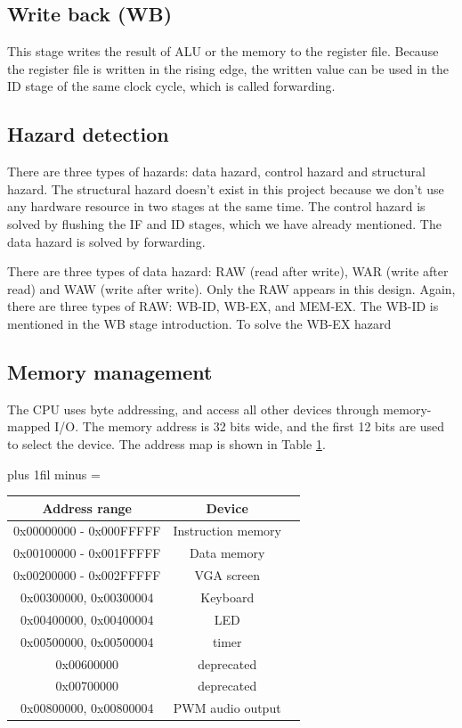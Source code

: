 \documentclass[
	a4paper, %
	11pt, %
]{CSUniSchoolLabReport}
\def\Scentering{\leftskip=0pt plus 1fil minus \Rmargin
                \rightskip=\leftskip}
\begin{document}
\subsection*{Write back (WB)}
This stage writes the result of ALU or the memory to the register file. Because the register file is written in the rising edge, the written value can be used in the ID stage of the same clock cycle, which is called forwarding.

\subsection*{Hazard detection}
There are three types of hazards: data hazard, control hazard and structural hazard. The structural hazard doesn't exist in this project because we don't use any hardware resource in two stages at the same time. The control hazard is solved by flushing the IF and ID stages, which we have already mentioned. The data hazard is solved by forwarding.

There are three types of data hazard: RAW (read after write), WAR (write after read) and WAW (write after write). Only the RAW appears in this design. Again, there are three types of RAW: WB-ID, WB-EX, and MEM-EX. The WB-ID is mentioned in the WB stage introduction. To solve the WB-EX hazard

\subsection{Memory management}

The CPU uses byte addressing, and access all other devices through memory-mapped I/O. The memory address is 32 bits wide, and the first 12 bits are used to select the device. The address map is shown in Table \ref{tab:address-map}.
\begin{table}[h]
    \Scentering
    \begin{tabular}{|c|c|c|}
        \hline
        Address range           & Device             \\
        \hline
        0x00000000 - 0x000FFFFF & Instruction memory \\
        \hline
        0x00100000 - 0x001FFFFF & Data memory        \\
        \hline
        0x00200000 - 0x002FFFFF & VGA screen         \\
        \hline
        0x00300000, 0x00300004  & Keyboard           \\
        \hline
        0x00400000, 0x00400004  & LED                \\
        \hline
        0x00500000, 0x00500004  & timer              \\
        \hline
        0x00600000              & deprecated         \\
        \hline
        0x00700000              & deprecated         \\
        \hline
        0x00800000, 0x00800004  & PWM audio output   \\
        \hline
    \end{tabular}
    \label{tab:address-map}
\end{table}
\end{document}
